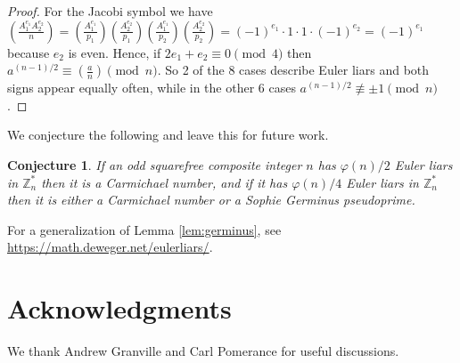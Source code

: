 \documentclass[runningheads]{amsart}
\newtheorem{conjecture}[theorem]{Conjecture}
\begin{document}
\begin{proof}
For the Jacobi symbol we have $
\left(\frac{A_1^{e_1}A_2^{e_2}}{n}\right)
=
\left(\frac{A_1^{e_1}}{p_1}\right)
\left(\frac{A_2^{e_2}}{p_1}\right)
\left(\frac{A_1^{e_1}}{p_2}\right)
\left(\frac{A_2^{e_2}}{p_2}\right) =
(-1)^{e_1}\cdot
1
\cdot
1
\cdot
(-1)^{e_2}
=
(-1)^{e_1}$
because
$e_2$
is even.
\relax
Hence,
if
$2e_1+e_2\equiv
0
\pmod4$
then $
a^{(n-1)/2}
\equiv
 \left(\frac{a}{n}\right)
\pmod{n}
$.
So 2 of the 8 cases describe Euler liars and both signs appear equally often,
while in the other 6 cases $
a^{(n-1)/2}
\not\equiv
\pm
1
\pmod{n}
$.
\end{proof}

We conjecture the following and leave this for future work.
\begin{conjecture}
If an odd squarefree composite integer $ n $ has
$\varphi(n)/2$
Euler liars in
$\mathbb{Z}_n^*$
then it is a Carmichael number,
and if it has
$\varphi(n)/4$
Euler liars in
$\mathbb{Z}_n^*$
then it is either a Carmichael number or a Sophie Germinus pseudoprime.
\end{conjecture}

For a generalization of Lemma
\ref{lem:germinus},
see
\url{https://math.deweger.net/eulerliars/}.

\relax

\relax
\section*{Acknowledgments}
We thank Andrew Granville and Carl Pomerance for useful discussions.



\end{document}
